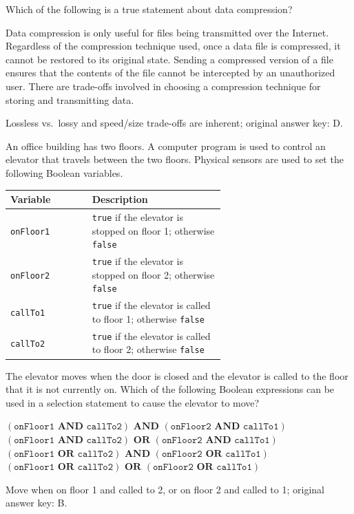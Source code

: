 \question[5]
Which of the following is a true statement about data compression?
\begin{choices}
  \choice Data compression is only useful for files being transmitted over the Internet.
  \choice Regardless of the compression technique used, once a data file is compressed, it cannot be restored to its original state.
  \choice Sending a compressed version of a file ensures that the contents of the file cannot be intercepted by an unauthorized user.
  \CorrectChoice There are trade-offs involved in choosing a compression technique for storing and transmitting data.
\end{choices}
\begin{solution}
  Lossless vs.\ lossy and speed/size trade-offs are inherent; original answer key: D.
\end{solution}

\newpage


\question[5]
An office building has two floors. A computer program is used to control an elevator that travels between the two floors. Physical sensors are used to set the following Boolean variables.
\begin{center}
  \small
  \begin{tabular}{|l|p{0.62\linewidth}|}
    \hline
    Variable & Description \\
    \hline
    \texttt{onFloor1} & \texttt{true} if the elevator is stopped on floor 1; otherwise \texttt{false} \\
    \hline
    \texttt{onFloor2} & \texttt{true} if the elevator is stopped on floor 2; otherwise \texttt{false} \\
    \hline
    \texttt{callTo1} & \texttt{true} if the elevator is called to floor 1; otherwise \texttt{false} \\
    \hline
    \texttt{callTo2} & \texttt{true} if the elevator is called to floor 2; otherwise \texttt{false} \\
    \hline
  \end{tabular}
\end{center}
The elevator moves when the door is closed and the elevator is called to the floor that it is not currently on. Which of the following Boolean expressions can be used in a selection statement to cause the elevator to move?
\begin{choices}
  \choice $(\texttt{onFloor1} \textbf{ AND } \texttt{callTo2}) \textbf{ AND } (\texttt{onFloor2} \textbf{ AND } \texttt{callTo1})$
  \CorrectChoice $(\texttt{onFloor1} \textbf{ AND } \texttt{callTo2}) \textbf{ OR } (\texttt{onFloor2} \textbf{ AND } \texttt{callTo1})$
  \choice $(\texttt{onFloor1} \textbf{ OR } \texttt{callTo2}) \textbf{ AND } (\texttt{onFloor2} \textbf{ OR } \texttt{callTo1})$
  \choice $(\texttt{onFloor1} \textbf{ OR } \texttt{callTo2}) \textbf{ OR } (\texttt{onFloor2} \textbf{ OR } \texttt{callTo1})$
\end{choices}
\begin{solution}
  Move when on floor 1 and called to 2, or on floor 2 and called to 1; original answer key: B.
\end{solution}

